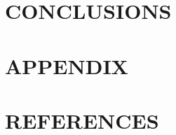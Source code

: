 \documentclass[12pt]{article}
\begin{document}
\begin{multicols}{2}
\blindtext\blindtext\blindtext



\begingroup\centering\section{CONCLUSIONS}\endgroup

\blindtext\blindtext\blindtext



\begingroup\centering\section{APPENDIX}\endgroup

\blindtext\blindtext\blindtext



\begingroup\centering\section{REFERENCES}\endgroup

\blindtext\blindtext\blindtext


\end{multicols}
\end{document}
